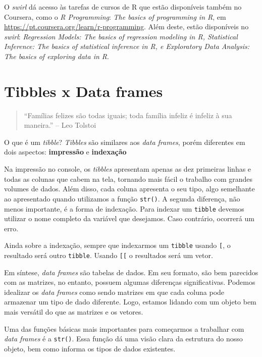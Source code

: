 \documentclass[]{book}
\begin{document}
O \emph{swirl} dá acesso às tarefas de cursos de R que estão disponíveis também no Coursera, como o \emph{R Programming}: \emph{The basics of programming in R}, em \url{https://pt.coursera.org/learn/r-programming}. Além deste, estão
disponíveis no \emph{swirl}: \emph{Regression Models: The basics of regression modeling in R, Statistical Inference: The basics of statistical inference in R, e Exploratory Data Analysis: The basics of exploring data in R}.

\hypertarget{literature}{%
\chapter{Tibbles x Data frames}\label{literature}}

\begin{quote}
``Famílias felizes são todas iguais; toda família infeliz é infeliz à sua maneira.'' -- Leo Tolstoi
\end{quote}

O que é um \emph{tibble}? \emph{Tibbles} são similares aos \emph{data frames}, porém diferentes em dois aspectos: \textbf{impressão} e \textbf{indexação}

Na impressão no console, os \emph{tibbles} apresentam apenas as dez primeiras linhas e todas as colunas que cabem na tela, tornando mais fácil o trabalho com grandes volumes de dados. Além disso, cada coluna apresenta o seu tipo, algo semelhante ao apresentado quando utilizamos a função \texttt{str()}. A segunda diferença, não menos importante, é a forma de indexação. Para indexar um \texttt{tibble} devemos utilizar o nome completo da variável que desejamos. Caso contrário, ocorrerá um erro.

Ainda sobre a indexação, sempre que indexarmos um \texttt{tibble} usando \texttt{{[}}, o resultado será outro \texttt{tibble}. Usando \texttt{{[}{[}} o resultados será um vetor.

Em síntese, \emph{data frames} são tabelas de dados. Em seu formato, são bem parecidos com as matrizes, no entanto, possuem algumas diferenças significativas. Podemos idealizar os \emph{data frames} como sendo matrizes em que cada coluna pode armazenar um tipo de dado diferente. Logo, estamos lidando com um objeto bem mais versátil do que as matrizes e os vetores.

Uma das funções básicas mais importantes para começarmos a trabalhar com \emph{data frames} é a \texttt{str()}. Essa função dá uma visão clara da estrutura do nosso objeto, bem como informa os tipos de dados existentes.
\end{document}
